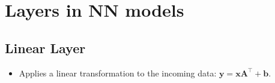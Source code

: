 \chapter{Layers in NN models}

\section{Linear Layer \cite{pytorch-Linear}}\label{nn: Linear Layer}
\begin{itemize}
    \item Applies a linear transformation to the incoming data: $\mathbf{y=xA^\top+b}$.
\end{itemize}



















